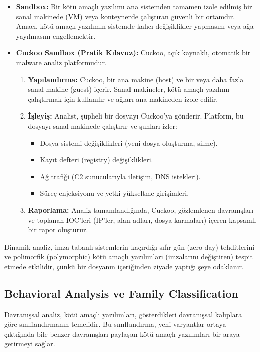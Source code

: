 \begin{itemize}
    \item \textbf{Sandbox:} Bir kötü amaçlı yazılımı ana sistemden tamamen izole edilmiş bir sanal makinede (VM) veya konteynerde çalıştıran güvenli bir ortamdır. Amacı, kötü amaçlı yazılımın sistemde kalıcı değişiklikler yapmasını veya ağa yayılmasını engellemektir.
    \item \textbf{Cuckoo Sandbox (Pratik Kılavuz):} Cuckoo, açık kaynaklı, otomatik bir malware analiz platformudur.
    \begin{enumerate}
        \item \textbf{Yapılandırma:} Cuckoo, bir ana makine (host) ve bir veya daha fazla sanal makine (guest) içerir. Sanal makineler, kötü amaçlı yazılımı çalıştırmak için kullanılır ve ağları ana makineden izole edilir.
        \item \textbf{İşleyiş:} Analist, şüpheli bir dosyayı Cuckoo'ya gönderir. Platform, bu dosyayı sanal makinede çalıştırır ve şunları izler:
        \begin{itemize}
            \item Dosya sistemi değişiklikleri (yeni dosya oluşturma, silme).
            \item Kayıt defteri (registry) değişiklikleri.
            \item Ağ trafiği (C2 sunucularıyla iletişim, DNS istekleri).
            \item Süreç enjeksiyonu ve yetki yükseltme girişimleri.
        \end{itemize}
        \item \textbf{Raporlama:} Analiz tamamlandığında, Cuckoo, gözlemlenen davranışları ve toplanan IOC'leri (IP'ler, alan adları, dosya karmaları) içeren kapsamlı bir rapor oluşturur.
    \end{enumerate}
\end{itemize}

Dinamik analiz, imza tabanlı sistemlerin kaçırdığı sıfır gün (zero-day) tehditlerini ve polimorfik (polymorphic) kötü amaçlı yazılımları (imzalarını değiştiren) tespit etmede etkilidir, çünkü bir dosyanın içeriğinden ziyade yaptığı şeye odaklanır.

\subsection{Behavioral Analysis ve Family Classification}

Davranışsal analiz, kötü amaçlı yazılımları, gösterdikleri davranışsal kalıplara göre sınıflandırmanın temelidir. Bu sınıflandırma, yeni varyantlar ortaya çıktığında bile benzer davranışları paylaşan kötü amaçlı yazılımları bir araya getirmeyi sağlar.


